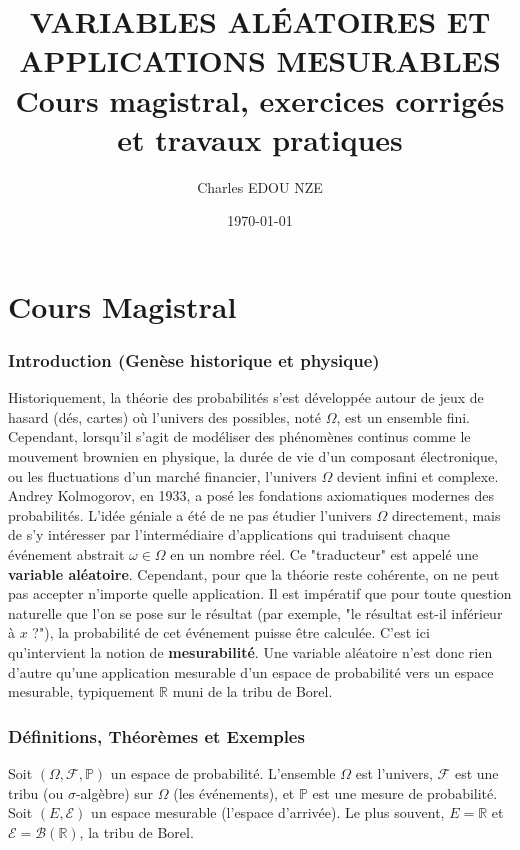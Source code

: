 \documentclass[11pt,a4paper]{article}
\title{\Huge VARIABLES ALÉATOIRES ET APPLICATIONS MESURABLES \\ \large Cours magistral, exercices corrigés et travaux pratiques}
\author{\Large Charles EDOU NZE}
\date{\today}
\begin{document}
\maketitle
\tableofcontents
\newpage

\part{Cours Magistral}



\section{Introduction (Genèse historique et physique)}
Historiquement, la théorie des probabilités s'est développée autour de jeux de hasard (dés, cartes) où l'univers des possibles, noté $\Omega$, est un ensemble fini. Cependant, lorsqu'il s'agit de modéliser des phénomènes continus comme le mouvement brownien en physique, la durée de vie d'un composant électronique, ou les fluctuations d'un marché financier, l'univers $\Omega$ devient infini et complexe.
Andrey Kolmogorov, en 1933, a posé les fondations axiomatiques modernes des probabilités. L'idée géniale a été de ne pas étudier l'univers $\Omega$ directement, mais de s'y intéresser par l'intermédiaire d'applications qui traduisent chaque événement abstrait $\omega \in \Omega$ en un nombre réel. Ce "traducteur" est appelé une \textbf{variable aléatoire}.
Cependant, pour que la théorie reste cohérente, on ne peut pas accepter n'importe quelle application. Il est impératif que pour toute question naturelle que l'on se pose sur le résultat (par exemple, "le résultat est-il inférieur à $x$ ?"), la probabilité de cet événement puisse être calculée. C'est ici qu'intervient la notion de \textbf{mesurabilité}. Une variable aléatoire n'est donc rien d'autre qu'une application mesurable d'un espace de probabilité vers un espace mesurable, typiquement $\mathbb{R}$ muni de la tribu de Borel.

\section{Définitions, Théorèmes et Exemples}

Soit $(\Omega, \mathcal{F}, \mathbb{P})$ un espace de probabilité. L'ensemble $\Omega$ est l'univers, $\mathcal{F}$ est une tribu (ou $\sigma$-algèbre) sur $\Omega$ (les événements), et $\mathbb{P}$ est une mesure de probabilité.
Soit $(E, \mathcal{E})$ un espace mesurable (l'espace d'arrivée). Le plus souvent, $E = \mathbb{R}$ et $\mathcal{E} = \mathcal{B}(\mathbb{R})$, la tribu de Borel.
\end{document}
